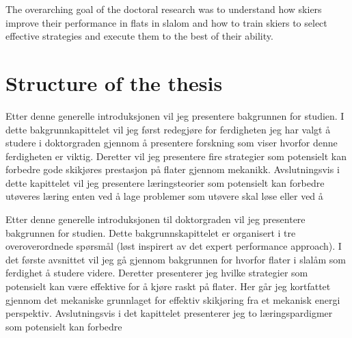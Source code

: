 
The overarching goal of the doctoral research was to understand how skiers improve their performance in flats in slalom and how to train skiers to select effective strategies and execute them to the best of their ability.

\section{Structure of the thesis}
Etter denne generelle introduksjonen vil jeg presentere bakgrunnen for studien. I dette bakgrunnkapittelet vil jeg først redegjøre for ferdigheten jeg har valgt å studere i doktorgraden gjennom å presentere forskning som viser hvorfor denne ferdigheten er viktig. Deretter vil jeg presentere fire strategier som potensielt kan forbedre gode skikjøres prestasjon på flater gjennom mekanikk. Avslutningsvis i dette kapittelet vil jeg presentere læringsteorier som potensielt kan forbedre utøveres læring enten ved å lage problemer som utøvere skal løse eller ved å 


Etter denne generelle introduksjonen til doktorgraden vil jeg presentere bakgrunnen for studien. Dette bakgrunnskapittelet er organisert i tre overoverordnede spørsmål (løst inspirert av det expert performance approach). I det første avsnittet vil jeg gå gjennom bakgrunnen for hvorfor flater i slalåm som ferdighet å studere videre. Deretter presenterer jeg hvilke strategier som potensielt kan være effektive for å kjøre raskt på flater. Her går jeg kortfattet gjennom det mekaniske grunnlaget for effektiv skikjøring fra et mekanisk energi perspektiv. Avslutningsvis i det kapittelet presenterer jeg to læringspardigmer som potensielt kan forbedre 

